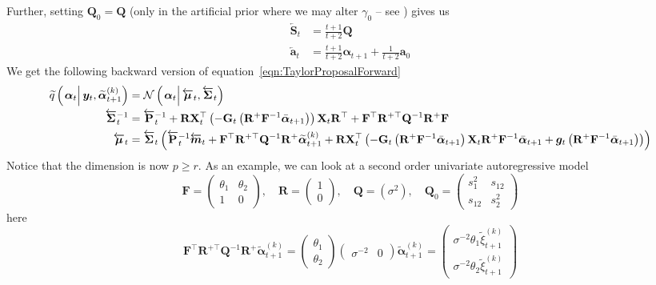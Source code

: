 \documentclass[9pt, notitlepage]{article}
\renewcommand{\vec}[1]{\bm{#1}}
\newcommand{\vecb}[1]{\bar{\vec{#1}}}
\newcommand{\vecLarrow}[1]{\overleftarrow{\vec{#1}}}
\newcommand{\mat}[1]{\mathbf{#1}}
\newcommand{\matLarrow}[1]{\overleftarrow{\mat{#1}}}
\newcommand{\Lparen}[1]{\left( #1\right)}
\newcommand{\Cond}[2]{\left. #1 \vphantom{#2} \right\vert  #2}
\newcommand{\optor}[2]{#1\Lparen{#2}}
\newcommand{\optorC}[3]{\optor{#1}{\Cond{#2}{#3}}}
\newcommand{\normalC}[3]{\optorC{\mathcal{N}}{#1}{#2,#3}}
\newcommand{\IDAproxC}[2]{\optorC{\widetilde{q}}{#1}{#2}}
\newcommand{\particB}[3]{\widetilde{#1}_{#2}^{\Lparen{#3}}}
\newcommand{\dimState}{p}
\newcommand{\dimRng}{r}
\begin{document}
%
Further, setting $\mat{Q}_0 = \mat{Q}$ (only in the artificial prior where we may alter $\gamma_0$ -- see \citet[page 70]{briers10}) gives us %
%
\begin{equation}\begin{split}\label{eqn:FirstOrderStrange}
	\matLarrow{S}_t &= \frac{t +1}{t + 2} \mat{Q} \\
%
	\vecLarrow{a}_t &= %
		\frac{t + 1}{t + 2}\vec{\alpha}_{t+1} +
		\frac{1}{ t+ 2} \vec{a}_0
\end{split}\end{equation}
%
We get the following backward version of equation~\eqref{eqn:TaylorProposalForward}%
%
{\scriptsize%
\begin{equation}\begin{split}\label{eqn:bw_approx}
	\IDAproxC{\vec{\alpha}_t}{\vec{y}_t, \particB{\vec{\alpha}}{t + 1}{k}} &=   %
		\normalC{\vec{\alpha}_t}{\vecLarrow{\mu}_t}{\matLarrow{\Sigma}_t} \\
%
	\matLarrow{\Sigma}_t^{-1} &=
		\matLarrow{P}_t^{-1} +
		\mat{R}\mat{X}_t^\top\Lparen{-\mat{G}_t\Lparen{
		    \mat{R}^{+}\mat{F}^{-1}\vecb{\alpha}_{t + 1}}}
		\mat{X}_t\mat{R}^\top + 
		\mat{F}^\top\mat{R}^{+\top}\mat{Q}^{-1}
		\mat{R}^{+}\mat{F}  \\
%
	\vecLarrow{\mu}_t
	 &= \matLarrow{\Sigma}_t \Lparen{
		\matLarrow{P}_t^{-1}\vecLarrow{m}_t +
		\mat{F}^\top\mat{R}^{+\top}
		\mat{Q}^{-1}\mat{R}^{+}\particB{\vec{\alpha}}{t + 1}{k} +
		\mat{R}\mat{X}_t^\top
		\Lparen{
			-\mat{G}_t\Lparen{\mat{R}^{+}\mat{F}^{-1}\vecb{\alpha}_{t + 1}}
			\mat{X}_t\mat{R}^{+}\mat{F}^{-1}\vecb{\alpha}_{t + 1} +
			\vec{g}_t\Lparen{\mat{R}^{+}\mat{F}^{-1}\vecb{\alpha}_{t + 1}}
		}}
\end{split}\end{equation}
}%
%
Notice that the dimension is now $\dimState \geq \dimRng$. As an example, we can look at a second order univariate autoregressive model %
%
$$
\mat{F} = \begin{pmatrix} 
  \theta_1 & \theta_2 \\
  1        & 0
\end{pmatrix}, \quad 
\mat{R} = \begin{pmatrix} 1  \\ 0 \end{pmatrix}, \quad 
\mat{Q} = \Lparen{\sigma^2}, \quad
\mat{Q}_0 = \begin{pmatrix} s_1^2 & s_{12} \\ s_{12} & s_2^2 \end{pmatrix}
$$
%
here %
%
$$
\mat{F}^\top\mat{R}^{+\top} \mat{Q}^{-1}\mat{R}^{+}\particB{\vec{\alpha}}{t + 1}{k} = 
\begin{pmatrix} \theta_1 \\ \theta_2 \end{pmatrix}
\begin{pmatrix} \sigma^{-2} & 0 \end{pmatrix}
\particB{\vec{\alpha}}{t + 1}{k} = 
\begin{pmatrix} 
    \sigma^{-2}\theta_1\particB{\xi}{t + 1}{k} \\ 
    \sigma^{-2}\theta_2\particB{\xi}{t + 1}{k}    
\end{pmatrix}
$$%
\end{document}
